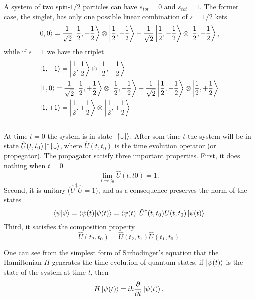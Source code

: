 \documentclass{article}
\begin{document}
A system of two spin-$1/2$ particles can have $s_{tot}=0$ and $s_{tot}=1$. The former case, the singlet, has only one possible linear combination of $s=1/2$ kets
\begin{equation}
\ket{0,0}=\frac{1}{\sqrt{2}}\ket{\frac{1}{2},+\frac{1}{2}}\otimes\ket{\frac{1}{2},-\frac{1}{2}}-\frac{1}{\sqrt{2}}\ket{\frac{1}{2},-\frac{1}{2}}\otimes\ket{\frac{1}{2},+\frac{1}{2}},
\end{equation}
while if $s=1$ we have the triplet
\begin{align}
&\ket{1,-1} = \ket{\frac{1}{2},\frac{1}{2}}\otimes\ket{\frac{1}{2},-\frac{1}{2}} \\
&\ket{1, 0} = \frac{1}{\sqrt{2}}\ket{\frac{1}{2},+\frac{1}{2}}\otimes\ket{\frac{1}{2},-\frac{1}{2}} + \frac{1}{\sqrt{2}}\ket{\frac{1}{2},-\frac{1}{2}}\otimes\ket{\frac{1}{2},+\frac{1}{2}} \\
&\ket{1,+1} = \ket{\frac{1}{2},+\frac{1}{2}}\otimes\ket{\frac{1}{2},+\frac{1}{2}}
\end{align}


\subsection{}
At time $t=0$ the system is in state $\ket{\uparrow\downarrow\downarrow}$. After som time $t$ the system will be in state $\hat{U}(t,t_0)\ket{\uparrow\downarrow\downarrow}$, where $\hat{U}(t,t_0)$ is the time evolution operator (or propegator). The propagator satisfy three important properties. First, it does nothing when $t=0$
\begin{equation}
\lim_{t\to t_0}\hat{U}(t,t0)=1.
\end{equation}
Second, it is unitary ($\hat{U}^{\dagger}\hat{U}=1$), and as a consequence preserves the norm of the states
\begin{equation}
\braket{\psi} = \braket{\psi(t)} = \bra{\psi(t)} \hat{U}^{\dagger}(t,t_0){U}(t,t_0) \ket{\psi(t)}
\end{equation}
Third, it satisfies the composition property
\begin{equation}
\hat{U}(t_2,t_0)=\hat{U}(t_2,t_1)\hat{U}(t_1,t_0)
\end{equation}

One can see from the simplest form of Scrhödinger's equation that the Hamiltonian $H$ generates the time evolution of quantum states. if $\ket{\psi(t)}$ is the state of the system at time $t$, then
\begin{equation}
H\ket{\psi(t)}=i\hbar\frac{\partial}{\partial t}\ket{\psi(t)}.
\end{equation}
\end{document}
